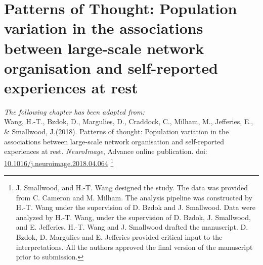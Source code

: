\chapter{Patterns of Thought: Population variation in the associations between large-scale network organisation and self-reported experiences at rest}
\label{ch:study2}

\textit{The following chapter has been adapted from:\\}
Wang, H.-T., Bzdok, D., Margulies, D., Craddock, C., Milham, M., Jefferies, E., \& Smallwood, J.(2018). 
Patterns of thought: Population variation in the associations between large-scale network organisation and self-reported experiences at rest. 
\textit{NeuroImage}, Advance online publication. doi: \url{10.1016/j.neuroimage.2018.04.064}
\footnote{
J. Smallwood, and H.-T. Wang designed the study. The data was provided from C. Cameron and M. Milham. The analysis pipeline was constructed by H.-T. Wang under the supervision of D. Bzdok and J. Smallwood. Data were analyzed by H.-T. Wang, under the supervision of D. Bzdok, J. Smallwood, and E. Jefferies. H.-T. Wang and J. Smallwood drafted the manuscript. D. Bzdok, D. Margulies and E. Jefferies provided critical input to the interpretations. All the authors approved the final version of the manuscript prior to submission.}
\\


\newpage

